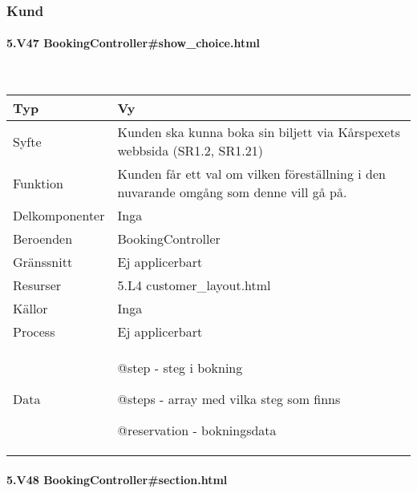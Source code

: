 \documentclass[a4paper, twoside, 11pt, titlepage]{article}
\begin{document}
		\subsubsection{Kund}



			\paragraph{5.V47 BookingController\#show\_choice.html}\

			\begin {table} [ht] \begin{tabular} {  p{3.5cm} p{9.6cm} }
				\hline
				{Typ} & {Vy} \\
				\hline
				{Syfte} & {Kunden ska kunna boka sin biljett via Kårspexets webbsida (SR1.2, SR1.21)} \\
				\hline
				{Funktion} & {Kunden får ett val om vilken föreställning i den nuvarande omgång som denne vill gå på.} \\
				\hline
				{Delkomponenter} & {Inga} \\
				\hline
				{Beroenden} & {BookingController} \\
				\hline
				{Gränssnitt} & {Ej applicerbart} \\
				\hline
				{Resurser} & {5.L4 customer\_layout.html } \\
				\hline
				{Källor} & {Inga} \\
				\hline
				{Process} & {Ej applicerbart} \\
				\hline
				{Data} & {@step - steg i bokning

@steps - array med vilka steg som finns

@reservation - bokningsdata} \\
				\hline
			\end{tabular} \end{table} \FloatBarrier


			\paragraph{5.V48 BookingController\#section.html}\
\end{document}
